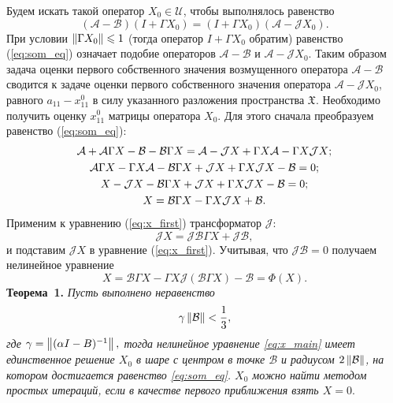 
Будем искать такой оператор $X_0 \in \mathcal{U}$, чтобы выполнялось равенство
\begin{equation}\label{eq:som_eq}
	(\mathcal{A}-\mathcal{B})(I + \Gamma X_0) = (I + \Gamma X_0)(\mathcal{A}-\mathcal{J}X_0).
\end{equation}
При условии $\left\|\Gamma X_0\right\| \leqslant 1$ (тогда оператор $I + \Gamma X_0$ обратим) равенство (\ref{eq:som_eq}) означает подобие операторов $\mathcal{A}-\mathcal{B}$ и $\mathcal{A}-\mathcal{J}X_0$. Таким образом задача оценки первого собственного значения возмущенного оператора $\mathcal{A}-\mathcal{B}$ сводится к задаче оценки первого собственного значения оператора $\mathcal{A}-\mathcal{J}X_0$, равного $a_{11} - x^{0}_{11}$ в силу указанного разложения пространства $\mathfrak{X}$. Необходимо получить оценку $x^{0}_{11}$ матрицы оператора $X_0$. Для этого сначала преобразуем равенство (\ref{eq:som_eq}):
\begin{gather}
	\mathcal{A} + \mathcal{A} \Gamma X - \mathcal{B} - \mathcal{B} \Gamma X = \mathcal{A} - \mathcal{J} X + \Gamma X \mathcal{A} - \Gamma X \mathcal{J} X; \notag \\
	\mathcal{A} \Gamma X - \Gamma X \mathcal{A} - \mathcal{B} \Gamma X + \mathcal{J} X + \Gamma X \mathcal{J} X - \mathcal{B} = 0; \notag \\
	X - \mathcal{J} X - \mathcal{B} \Gamma X + \mathcal{J} X + \Gamma X \mathcal{J} X - \mathcal{B} = 0;  \notag \\
	X = \mathcal{B} \Gamma X - \Gamma X \mathcal{J} X + \mathcal{B}. \label{eq:x_first}
\end{gather}
Применим к уравнению (\ref{eq:x_first}) трансформатор $\mathcal{J}$:
$$
	\mathcal{J}X = \mathcal{J}\mathcal{B}\Gamma X + \mathcal{J}\mathcal{B},
$$ 
и подставим $\mathcal{J}X$ в уравнение (\ref{eq:x_first}). Учитывая, что $\mathcal{JB} = 0 $ получаем нелинейное уравнение
\begin{equation}\label{eq:x_main}
	X = \mathcal{B}\Gamma X - \Gamma X \mathcal{J}(\mathcal{B}\Gamma X) - \mathcal{B} = \Phi(X).
\end{equation}
\noindent\textbf{Теорема~1.}
{ \it Пусть выполнено неравенство
$$
\gamma\left\|\mathcal{B}\right\| < \frac{1}{3},
$$
где $\gamma = \left\|(\alpha I - B)^{-1}\right\|,$ тогда нелинейное уравнение \eqref{eq:x_main} имеет единственное решение $X_0$ в шаре с центром в точке $\mathcal{B}$ и радиусом $2\left\|\mathcal{B}\right\|$, на котором достигается равенство \eqref{eq:som_eq}. $X_0$ можно найти методом простых итераций, если в качестве первого приближения взять $X = 0.$}

